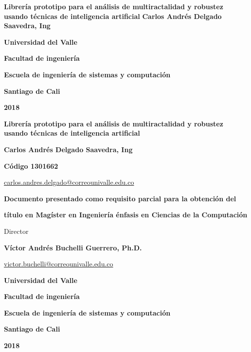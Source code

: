\begin{titlepage}
		\begin{center}
			{\bf Librería prototipo para el análisis de multiractalidad y robustez usando técnicas de inteligencia artificial}
			\vfill
			{\bf Carlos Andrés Delgado Saavedra, Ing}
			\vfill
			{\bf Universidad del Valle  \par}
			{\bf Facultad de ingeniería \par}
			{\bf Escuela de ingeniería de sistemas y computación \par}
			{\bf Santiago de Cali \par}
			{\bf 2018 \par}
		\end{center}
\end{titlepage}


\begin{titlepage}
	\begin{center}
		{\bf Librería prototipo para el análisis de multiractalidad y robustez usando técnicas de inteligencia artificial}
		\vfill
		{\bf Carlos Andrés Delgado Saavedra, Ing \par}
		{\bf Código 1301662 \par}
		{\url{carlos.andres.delgado@correounivalle.edu.co} \par}
		\vfill
		{\bf Documento presentado como requisito parcial para la obtención del \par}
		{\bf título en Magíster en Ingeniería énfasis en Ciencias de la Computación \par}
		\vfill

		{Director \par}
		{\bf Víctor Andrés Buchelli Guerrero, Ph.D. \par}
		{\url{victor.buchelli@correounivalle.edu.co} \par}
		\vfill
		{\bf Universidad del Valle  \par}
		{\bf Facultad de ingeniería \par}
		{\bf Escuela de ingeniería de sistemas y computación \par}
		{\bf Santiago de Cali \par}
		{\bf 2018 \par}
	\end{center}
\end{titlepage}
